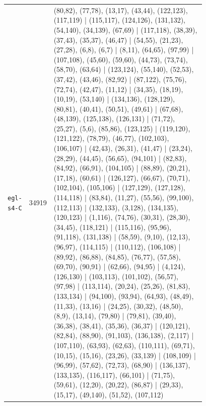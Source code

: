 \begin{landscape}
\begin{longtable}{lr>{\tiny\raggedright\arraybackslash}p{0.78\linewidth}}
\texttt{egl-s4-C} & 34919 & (80,82), (77,78), (13,17), (43,44), (122,123), (117,119) | (115,117), (124,126), (131,132), (54,140), (34,139), (67,69) | (117,118), (38,39), (37,43), (35,37), (46,47) | (54,55), (21,23), (27,28), (6,8), (6,7) | (8,11), (64,65), (97,99) | (107,108), (45,60), (59,60), (44,73), (73,74), (58,70), (63,64) | (123,124), (55,140), (52,53), (37,42), (43,46), (82,92) | (87,122), (75,76), (72,74), (42,47), (11,12) | (34,35), (18,19), (10,19), (53,140) | (134,136), (128,129), (80,81), (40,41), (50,51), (49,61) | (67,68), (48,139), (125,138), (126,131) | (71,72), (25,27), (5,6), (85,86), (123,125) | (119,120), (121,122), (78,79), (46,77), (102,103), (106,107) | (42,43), (26,31), (41,47) | (23,24), (28,29), (44,45), (56,65), (94,101) | (82,83), (84,92), (66,91), (104,105) | (88,89), (20,21), (17,18), (60,61) | (126,127), (66,67), (70,71), (102,104), (105,106) | (127,129), (127,128), (114,118) | (83,84), (11,27), (55,56), (99,100), (112,113) | (132,133), (3,128), (134,135), (120,123) | (1,116), (74,76), (30,31), (28,30), (34,45), (118,121) | (115,116), (95,96), (91,118), (131,138) | (58,59), (9,10), (12,13), (96,97), (114,115) | (110,112), (106,108) | (89,92), (86,88), (84,85), (76,77), (57,58), (69,70), (90,91) | (62,66), (94,95) | (4,124), (126,130) | (103,113), (101,102), (56,57), (97,98) | (113,114), (20,24), (25,26), (81,83), (133,134) | (94,100), (93,94), (64,93), (48,49), (11,33), (13,16) | (24,25), (30,32), (48,50), (8,9), (13,14), (79,80) | (79,81), (39,40), (36,38), (38,41), (35,36), (36,37) | (120,121), (82,84), (88,90), (91,103), (136,138), (2,117) | (107,110), (63,93), (62,63), (110,111), (69,71), (10,15), (15,16), (23,26), (33,139) | (108,109) | (96,99), (57,62), (72,73), (68,90) | (136,137), (133,135), (116,117), (66,101) | (71,75), (59,61), (12,20), (20,22), (86,87) | (29,33), (15,17), (49,140), (51,52), (107,112) \\[2pt]
\end{longtable}
\endgroup
\end{landscape}
\restoregeometry